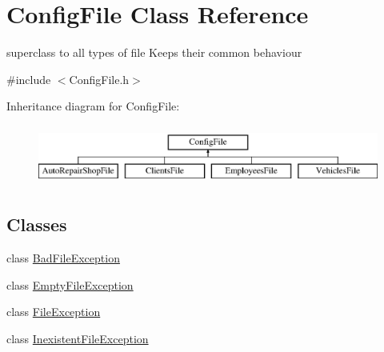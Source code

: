 \hypertarget{class_config_file}{}\section{Config\+File Class Reference}
\label{class_config_file}


superclass to all types of file Keeps their common behaviour  




{\ttfamily \#include $<$Config\+File.\+h$>$}

Inheritance diagram for Config\+File\+:\begin{figure}[H]
\begin{center}
\leavevmode
\includegraphics[height=2.000000cm]{class_config_file}
\end{center}
\end{figure}
\subsection*{Classes}
\begin{DoxyCompactItemize}
\item 
class \hyperlink{class_config_file_1_1_bad_file_exception}{Bad\+File\+Exception}
\item 
class \hyperlink{class_config_file_1_1_empty_file_exception}{Empty\+File\+Exception}
\item 
class \hyperlink{class_config_file_1_1_file_exception}{File\+Exception}
\item 
class \hyperlink{class_config_file_1_1_inexistent_file_exception}{Inexistent\+File\+Exception}
\end{DoxyCompactItemize}
